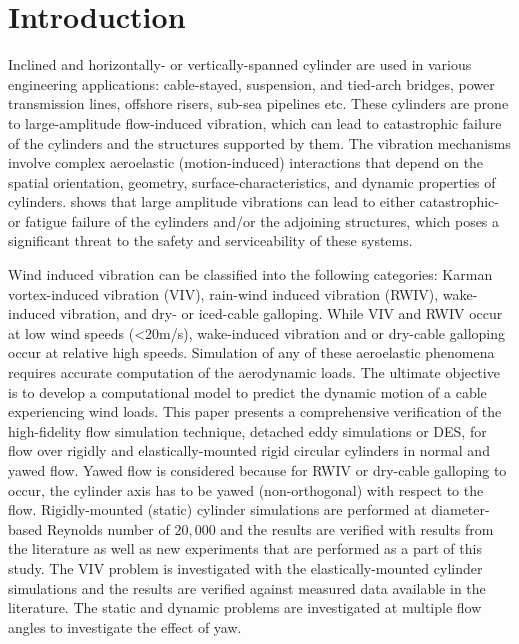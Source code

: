 \section{Introduction}
\label{sec:intro}
%
Inclined and horizontally- or vertically-spanned cylinder are used in various
engineering applications: cable-stayed, suspension, and tied-arch bridges,
power transmission lines, offshore risers, sub-sea pipelines etc. These
cylinders are prone to large-amplitude flow-induced vibration, which can lead
to catastrophic failure of the cylinders and the structures supported by them.
The vibration mechanisms involve complex aeroelastic (motion-induced)
interactions that depend on the spatial orientation, geometry,
surface-characteristics, and dynamic properties of
cylinders. \cite{davenport1995dynamics} shows that large amplitude vibrations
can lead to either catastrophic- or fatigue failure of the cylinders and/or the
adjoining structures, which poses a significant threat to the safety and
serviceability of these systems.

Wind induced vibration can be classified into the following categories: Karman
vortex-induced vibration (VIV), rain-wind induced vibration (RWIV),
wake-induced vibration, and dry- or iced-cable galloping. While VIV and RWIV
occur at low wind speeds (<20m/s), wake-induced vibration and or dry-cable
galloping occur at relative high speeds. Simulation of any of these aeroelastic
phenomena requires accurate computation of the aerodynamic loads. The ultimate
objective is to develop a computational model to predict the dynamic motion of
a cable experiencing wind loads. This paper presents a comprehensive
verification of the high-fidelity flow simulation technique, detached eddy
simulations or DES, for flow over rigidly and elastically-mounted rigid
circular cylinders in normal and yawed flow. Yawed flow is considered because
for RWIV or dry-cable galloping to occur, the cylinder axis has to be yawed
(non-orthogonal) with respect to the flow. Rigidly-mounted (static) cylinder
simulations are performed at diameter-based Reynolds number of $20,000$ and the
results are verified with results from the literature as well as new
experiments that are performed as a part of this study.  The VIV problem is
investigated with the elastically-mounted cylinder simulations and the results
are verified against measured data available in the literature. The static and
dynamic problems are investigated at multiple flow angles to investigate the
effect of yaw.



